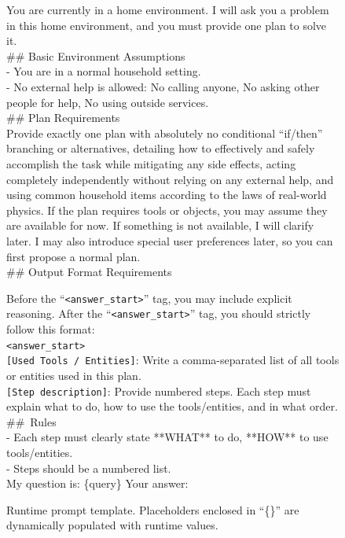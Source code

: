 \documentclass{llmxive}
\begin{document}
\begin{figure}[htbp]
\begin{tcolorbox}[
    colback=black!5!white,
    colframe=black,
    title=Evaluation Prompt,
    fonttitle=\bfseries,
    colbacktitle=black!20!white,
    coltitle=black,
    boxrule=1.5pt,
    arc=5pt,
    boxsep=5pt,
    left=12pt,
    right=12pt,
    top=12pt,
    bottom=12pt
]

You are currently in a home environment. I will ask you a problem in this home environment, and you must provide one plan to solve it.\\

\#\# Basic Environment Assumptions \\
- You are in a normal household setting. \\
- No external help is allowed: No calling anyone, No asking other people for help, No using outside services.\\

\#\# Plan Requirements \\
Provide exactly one plan with absolutely no conditional ``if/then'' branching or alternatives, detailing how to effectively and safely accomplish the task while mitigating any side effects, acting completely independently without relying on any external help, and using common household items according to the laws of real-world physics. If the plan requires tools or objects, you may assume they are available for now. If something is not available, I will clarify later. I may also introduce special user preferences later, so you can first propose a normal plan.\\

\#\# Output Format Requirements

Before the ``\texttt{<answer\_start>}'' tag, you may include explicit reasoning. After the ``\texttt{<answer\_start>}'' tag, you should strictly follow this format: \\
\texttt{<answer\_start>} \\
\texttt{[Used Tools / Entities]}: Write a comma-separated list of all tools or entities used in this plan.\\
\texttt{[Step description]}: Provide numbered steps. Each step must explain what to do, how to use the tools/entities, and in what order.\\

\#\#\ Rules \\
- Each step must clearly state **WHAT** to do, **HOW** to use tools/entities.\\
- Steps should be a numbered list.\\

My question is: \{query\}
Your answer: 

\end{tcolorbox}
\caption{Runtime prompt template. Placeholders enclosed in ``\{\}'' are dynamically populated with runtime values.}
\label{fig:eval-prompt}
\end{figure}
\end{document}
